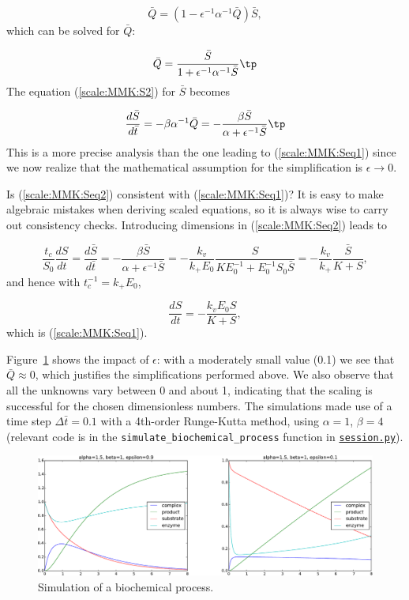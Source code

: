 \documentclass[graybox,envcountchap,sectrefs,final]{svmonodo}
\begin{document}
\[ \bar Q = (1 - \epsilon^{-1}\alpha^{-1}\bar Q)\bar S,\]
which can be solved for $\bar Q$:

\[ \bar Q = \frac{\bar S}{1 + \epsilon^{-1}\alpha^{-1}\bar S}\tp\]
The equation (\ref{scale:MMK:S2}) for $\bar S$ becomes

\begin{equation}
\frac{d\bar S}{d\bar t} = -\beta\alpha^{-1}\bar Q =
-\frac{\beta\bar S}{\alpha + \epsilon^{-1}\bar S}\tp
\label{scale:MMK:Seq2}
\end{equation}
This is a more precise analysis than the one leading to
(\ref{scale:MMK:Seq1}) since we now realize that the
mathematical assumption for the simplification is
$\epsilon\rightarrow 0$.

Is (\ref{scale:MMK:Seq2}) consistent with (\ref{scale:MMK:Seq1})? It is
easy to make algebraic mistakes when deriving scaled equations,
so it is always wise to carry out consistency checks.
Introducing dimensions in (\ref{scale:MMK:Seq2}) leads to

\[
\frac{t_c}{S_0}\frac{d S}{dt} =
\frac{d\bar S}{d\bar t}  =
-\frac{\beta\bar S}{\alpha + \epsilon^{-1}\bar S}
= -\frac{k_v}{k_+E_0}\frac{S}{KE_0^{-1} + E_0^{-1}S_0\bar S}
= -\frac{k_v}{k_+}\frac{\bar S}{K + S},\]
and hence with $t_c^{-1}=k_+E_0$,

\[ \frac{dS}{dt} = -\frac{k_vE_0 S}{K + S},\]
which is (\ref{scale:MMK:Seq1}).

Figure~\ref{scale:MMK:fig} shows the impact of $\epsilon$: with a moderately small
value (0.1) we see that $\bar Q\approx 0$, which justifies the
simplifications performed above. We also observe that all the unknowns
vary between 0 and about 1, indicating that the scaling is successful
for the chosen dimensionless numbers. The simulations made use of
a time step $\Delta\bar t=0.1$ with a 4th-order Runge-Kutta method,
using $\alpha=1$, $\beta=4$ (relevant code is in the
\Verb!simulate_biochemical_process! function in \href{{http://tinyurl.com/o8pb3yy/session.py}}{\nolinkurl{session.py}}).


\begin{figure}[!ht]  %
  \centerline{\includegraphics[width=1.0\linewidth]{fig-scaling/biochem.pdf}}
  \caption{
  Simulation of a biochemical process. \label{scale:MMK:fig}
  }
\end{figure}
\end{document}
